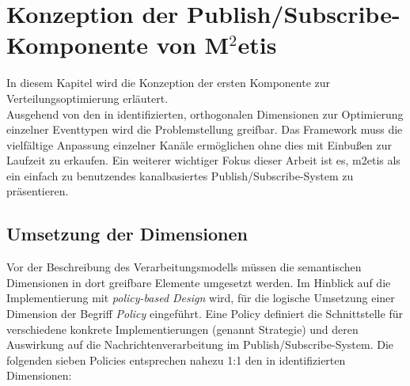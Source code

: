 \chapter[Konzeption der Publish/Subscribe-Komponente]{Konzeption der Publish/Subscribe-Komponente von M$^2$etis}
\label{chap:konzeption_pubsub}
In diesem Kapitel wird die Konzeption der ersten Komponente zur Verteilungsoptimierung erläutert.\\
Ausgehend von den in  identifizierten, orthogonalen Dimensionen zur Optimierung einzelner Eventtypen wird die Problemstellung greifbar. Das Framework muss die vielfältige Anpassung einzelner Kanäle ermöglichen ohne dies mit Einbußen zur Laufzeit zu erkaufen. Ein weiterer wichtiger Fokus dieser Arbeit ist es, \ac{m2etis} als ein einfach zu benutzendes kanalbasiertes Publish/Subscribe-System zu präsentieren.




\section{Umsetzung der Dimensionen}
Vor der Beschreibung des Verarbeitungsmodells müssen die semantischen Dimensionen in dort greifbare Elemente umgesetzt werden. Im Hinblick auf die Implementierung mit \emph{policy-based Design} wird, für die logische Umsetzung einer Dimension der Begriff \emph{Policy} eingeführt. Eine Policy definiert die Schnittstelle für verschiedene konkrete Implementierungen (genannt Strategie) und deren Auswirkung auf die Nachrichtenverarbeitung im Publish/Subscribe-System. Die folgenden sieben Policies entsprechen nahezu 1:1 den in  identifizierten Dimensionen:

